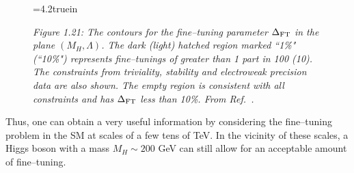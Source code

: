 \begin{figure}[htbp]
\begin{center}
\epsfxsize=4.2truein
\vspace*{-3mm}
\hspace*{0in}
\end{center}
\vspace*{-5mm}
{\it Figure 1.21: The contours for the fine--tuning parameter $\Delta_{\rm FT}$
in the  plane $(M_H, \Lambda)$. The dark (light) hatched region marked ``1\%" 
(``10\%") represents fine--tunings of greater than 1 part in 100 (10). The 
constraints from triviality, stability and electroweak precision data are also 
shown. The empty region is consistent with all constraints and has  
$\Delta_{\rm FT}$ less than 10\%. From Ref.~\cite{Kolda+Murayama}.}
\label{all-murayama}
\vspace*{-3mm}
\end{figure}

Thus, one can obtain a very useful information by considering the fine--tuning
problem in the SM at scales of a few tens of TeV. In the vicinity of these 
scales, a Higgs boson with a mass $M_H \sim 200$ GeV can still allow for an 
acceptable amount of fine--tuning. 
 
\newpage
